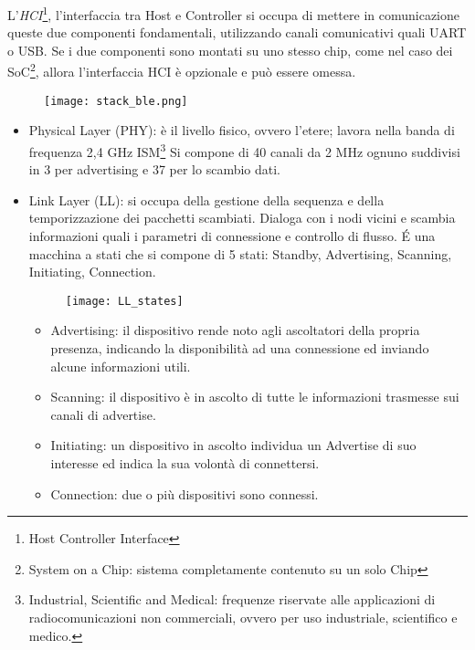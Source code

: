 L'\emph{HCI}\footnote{Host Controller Interface}, l'interfaccia tra Host e Controller si occupa di mettere in comunicazione queste due componenti fondamentali, utilizzando canali comunicativi quali UART o USB.
Se i due componenti sono montati su uno stesso chip, come nel caso dei SoC\footnote{System on a Chip: sistema completamente contenuto su un solo Chip}, allora l'interfaccia HCI è opzionale e può essere omessa.

\begin{figure}[H]
\texttt{[image: stack\_ble.png]}
\centering
\end{figure}

\begin{itemize}
\item Physical Layer (PHY): è il livello fisico, ovvero l'etere; lavora nella banda di frequenza 2,4 GHz ISM\footnote{Industrial, Scientific and Medical: frequenze riservate alle applicazioni di radiocomunicazioni non commerciali, ovvero per uso industriale, scientifico e medico.} Si compone di 40 canali da 2 MHz ognuno suddivisi in 3 per advertising e 37 per lo scambio dati.

\item Link Layer (LL): si occupa della gestione della sequenza e della temporizzazione dei pacchetti scambiati. Dialoga con i nodi vicini e scambia informazioni quali i parametri di connessione e controllo di flusso.\linebreak 
\'E una macchina a stati che si compone di 5 stati: Standby, Advertising, Scanning, Initiating, Connection. 

\begin{figure}[H]
\texttt{[image: LL\_states]}
\centering
\end{figure}

\begin{itemize}

\item Advertising: il dispositivo rende noto agli ascoltatori della propria presenza, indicando la disponibilità ad una connessione ed inviando alcune informazioni utili.

\item Scanning: il dispositivo è in ascolto di tutte le informazioni trasmesse sui canali di advertise.

\item Initiating: un dispositivo in ascolto individua un Advertise di suo interesse ed indica la sua volontà di connettersi.

\item Connection: due o più dispositivi sono connessi.


\end{itemize}
\end{itemize}
